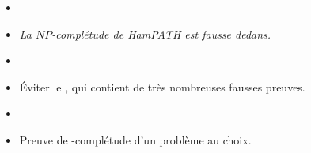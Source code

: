 \documentclass{agregfiche}
\begin{document}
\begin{itemize}
    \item 
\item 
\textit{La $NP$-complétude de HamPATH est fausse dedans.}
\item 
\item Éviter le , qui contient de très nombreuses 
fausses preuves.
\end{itemize}

\secdev

\begin{itemize}
    \item 
\item Preuve de \NP-complétude d'un problème au choix.
\end{itemize}
\end{document}
